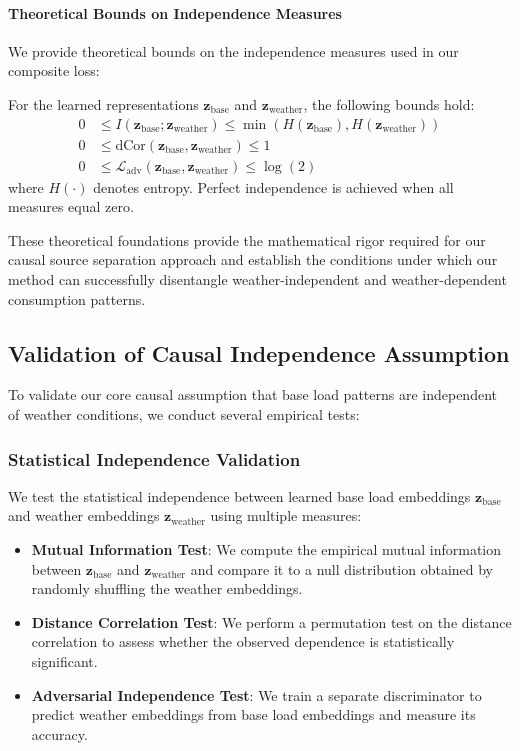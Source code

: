 \documentclass[journal]{IEEEtran}
\begin{document}
\paragraph{Theoretical Bounds on Independence Measures}
We provide theoretical bounds on the independence measures used in our composite loss:

\begin{proposition}
For the learned representations $\mathbf{z}_{\text{base}}$ and $\mathbf{z}_{\text{weather}}$, the following bounds hold:
\begin{align}
0 &\leq I(\mathbf{z}_{\text{base}}; \mathbf{z}_{\text{weather}}) \leq \min(H(\mathbf{z}_{\text{base}}), H(\mathbf{z}_{\text{weather}})) \\
0 &\leq \text{dCor}(\mathbf{z}_{\text{base}}, \mathbf{z}_{\text{weather}}) \leq 1 \\
0 &\leq \mathcal{L}_{\text{adv}}(\mathbf{z}_{\text{base}}, \mathbf{z}_{\text{weather}}) \leq \log(2)
\end{align}
where $H(\cdot)$ denotes entropy. Perfect independence is achieved when all measures equal zero.
\end{proposition}

These theoretical foundations provide the mathematical rigor required for our causal source separation approach and establish the conditions under which our method can successfully disentangle weather-independent and weather-dependent consumption patterns.

\subsection{Validation of Causal Independence Assumption}
To validate our core causal assumption that base load patterns are independent of weather conditions, we conduct several empirical tests:

\subsubsection{Statistical Independence Validation}
We test the statistical independence between learned base load embeddings $\mathbf{z}_{\text{base}}$ and weather embeddings $\mathbf{z}_{\text{weather}}$ using multiple measures:
\begin{itemize}
    \item \textbf{Mutual Information Test}: We compute the empirical mutual information between $\mathbf{z}_{\text{base}}$ and $\mathbf{z}_{\text{weather}}$ and compare it to a null distribution obtained by randomly shuffling the weather embeddings.
    \item \textbf{Distance Correlation Test}: We perform a permutation test on the distance correlation to assess whether the observed dependence is statistically significant.
    \item \textbf{Adversarial Independence Test}: We train a separate discriminator to predict weather embeddings from base load embeddings and measure its accuracy.
\end{itemize}
\end{document}
